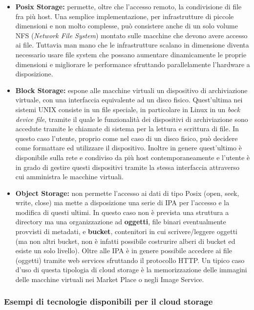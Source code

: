 \begin{itemize}
\tightlist
\item
  \textbf{Posix Storage:} permette, oltre che l'accesso remoto, la
  condivisione di file fra più host. Una semplice implementazione, per
  infrastrutture di piccole dimensioni e non molto complesse, può
  consistere anche di un solo volume NFS (\emph{Network File System})
  montato sulle macchine che devono avere accesso ai file. Tuttavia man
  mano che le infrastrutture scalano in dimensione diventa necessario
  usare file system che possano aumentare dinamicamente le proprie
  dimensioni e migliorare le performance sfruttando parallelamente
  l'hardware a disposizione.
\item
  \textbf{Block Storage:} espone alle macchine virtuali un dispositivo
  di archiviazione virtuale, con una interfaccia equivalente ad un disco
  fisico. Quest'ultima nei sistemi UNIX consiste in un file speciale, in
  particolare in Linux in un \emph{bock device file}, tramite il quale
  le funzionalità dei dispositivi di archiviazione sono accedute tramite
  le chiamate di sistema per la lettura e scrittura di file. In questo
  caso l'utente, proprio come nel caso di un disco fisico, può decidere
  come formattare ed utilizzare il dispositivo. Inoltre in genere
  quest'ultimo è disponibile sulla rete e condiviso da più host
  contemporaneamente e l'utente è in grado di gestire questi dispositivi
  tramite la stessa interfaccia attraverso cui amministra le macchine
  virtuali.
\item
  \textbf{Object Storage:} non permette l'accesso ai dati di tipo Posix
  (open, seek, write, close) ma mette a disposizione una serie di IPA
  per l'accesso e la modifica di questi ultimi. In questo caso non è
  prevista una struttura a directory ma una organizzazione ad
  \textbf{oggetti}, file binari eventualmente provvisti di metadati, e
  \textbf{bucket}, contenitori in cui scrivere/leggere oggetti (ma non
  altri bucket, non è infatti possibile costrurire alberi di bucket ed
  esiste un solo livello). Oltre alle IPA è in genere possibile accedere
  ai file (oggetti) tramite web services sfruttando il protocollo HTTP.
  Un tipico caso d'uso di questa tipologia di cloud storage è la
  memorizzazione delle immagini delle macchine virtuali nei Market Place
  o negli Image Service.
\end{itemize}

\subsubsection{Esempi di tecnologie disponibili per il cloud
storage}\label{esempi-di-tecnologie-disponibili-per-il-cloud-storage}

